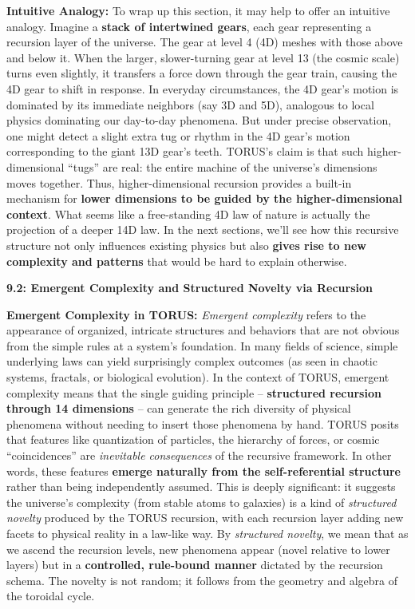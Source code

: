 \documentclass[
]{article}
\begin{document}
\textbf{Intuitive Analogy:} To wrap up this section, it may help to
offer an intuitive analogy. Imagine a \textbf{stack of intertwined
gears}, each gear representing a recursion layer of the universe. The
gear at level 4 (4D) meshes with those above and below it. When the
larger, slower-turning gear at level 13 (the cosmic scale) turns even
slightly, it transfers a force down through the gear train, causing the
4D gear to shift in response. In everyday circumstances, the 4D gear's
motion is dominated by its immediate neighbors (say 3D and 5D),
analogous to local physics dominating our day-to-day phenomena. But
under precise observation, one might detect a slight extra tug or rhythm
in the 4D gear's motion corresponding to the giant 13D gear's teeth.
TORUS's claim is that such higher-dimensional ``tugs'' are real: the
entire machine of the universe's dimensions moves together. Thus,
higher-dimensional recursion provides a built-in mechanism for
\textbf{lower dimensions to be guided by the higher-dimensional
context}. What seems like a free-standing 4D law of nature is actually
the projection of a deeper 14D law. In the next sections, we'll see how
this recursive structure not only influences existing physics but also
\textbf{gives rise to new complexity and patterns} that would be hard to
explain otherwise.

\textbf{9.2: Emergent Complexity and Structured Novelty via Recursion}

\textbf{Emergent Complexity in TORUS:} \emph{Emergent complexity} refers
to the appearance of organized, intricate structures and behaviors that
are not obvious from the simple rules at a system's foundation. In many
fields of science, simple underlying laws can yield surprisingly complex
outcomes (as seen in chaotic systems, fractals, or biological
evolution). In the context of TORUS, emergent complexity means that the
single guiding principle -- \textbf{structured recursion through 14
dimensions} -- can generate the rich diversity of physical phenomena
without needing to insert those phenomena by hand. TORUS posits that
features like quantization of particles, the hierarchy of forces, or
cosmic ``coincidences'' are \emph{inevitable consequences} of the
recursive framework. In other words, these features \textbf{emerge
naturally from the self-referential structure} rather than being
independently assumed. This is deeply significant: it suggests the
universe's complexity (from stable atoms to galaxies) is a kind of
\emph{structured novelty} produced by the TORUS recursion, with each
recursion layer adding new facets to physical reality in a law-like way.
By \emph{structured novelty}, we mean that as we ascend the recursion
levels, new phenomena appear (novel relative to lower layers) but in a
\textbf{controlled, rule-bound manner} dictated by the recursion schema.
The novelty is not random; it follows from the geometry and algebra of
the toroidal cycle.
\end{document}
